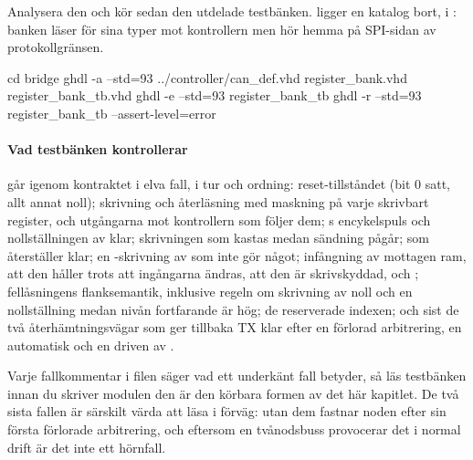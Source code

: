 Analysera den och kör sedan den utdelade testbänken.  ligger en katalog bort, i
: banken läser  för sina typer mot kontrollern men hör hemma på
SPI-sidan av protokollgränsen.

\begin{shell}
cd bridge
ghdl -a --std=93 ../controller/can_def.vhd register_bank.vhd register_bank_tb.vhd
ghdl -e --std=93 register_bank_tb
ghdl -r --std=93 register_bank_tb --assert-level=error
\end{shell}

\paragraph{Vad testbänken kontrollerar}
 går igenom kontraktet i elva fall, i tur och ordning: reset-tillståndet
(bit 0 satt, allt annat noll); skrivning och återläsning med maskning på varje skrivbart register,
och utgångarna mot kontrollern som följer dem; s encykelspuls och nollställningen av
klar; skrivningen som kastas medan sändning pågår;  som återställer klar; en
-skrivning av  som inte gör något; infångning av mottagen ram, att den håller
trots att ingångarna ändras, att den är skrivskyddad, och ; fellåsningens flanksemantik,
inklusive regeln om skrivning av noll och en nollställning medan nivån fortfarande är hög; de
reserverade indexen; och sist de två återhämtningsvägar som ger tillbaka TX klar efter en förlorad
arbitrering, en automatisk och en driven av .

Varje fallkommentar i filen säger vad ett underkänt fall betyder, så läs testbänken innan du skriver
modulen \textemdash{} den är den körbara formen av det här kapitlet. De två sista fallen är särskilt
värda att läsa i förväg: utan dem fastnar noden efter sin första förlorade arbitrering, och eftersom
en tvånodsbuss provocerar det i normal drift är det inte ett hörnfall.
